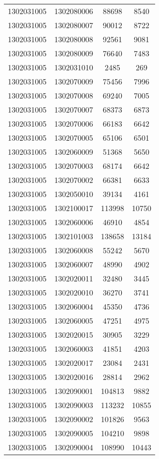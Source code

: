 \begin{longtable}{llcc}
1302031005 & 1302080006 & 88698 & 8540\\
1302031005 & 1302080007 & 90012 & 8722\\
1302031005 & 1302080008 & 92561 & 9081\\
1302031005 & 1302080009 & 76640 & 7483\\
1302031005 & 1302031010 & 2485 & 269\\
1302031005 & 1302070009 & 75456 & 7996\\
1302031005 & 1302070008 & 69240 & 7005\\
1302031005 & 1302070007 & 68373 & 6873\\
1302031005 & 1302070006 & 66183 & 6642\\
1302031005 & 1302070005 & 65106 & 6501\\
1302031005 & 1302060009 & 51368 & 5650\\
1302031005 & 1302070003 & 68174 & 6642\\
1302031005 & 1302070002 & 66381 & 6633\\
1302031005 & 1302050010 & 39134 & 4161\\
1302031005 & 1302100017 & 113998 & 10750\\
1302031005 & 1302060006 & 46910 & 4854\\
1302031005 & 1302101003 & 138658 & 13184\\
1302031005 & 1302060008 & 55242 & 5670\\
1302031005 & 1302060007 & 48990 & 4902\\
1302031005 & 1302020011 & 32480 & 3445\\
1302031005 & 1302020010 & 36270 & 3741\\
1302031005 & 1302060004 & 45350 & 4736\\
1302031005 & 1302060005 & 47251 & 4975\\
1302031005 & 1302020015 & 30905 & 3229\\
1302031005 & 1302060003 & 41851 & 4203\\
1302031005 & 1302020017 & 23084 & 2431\\
1302031005 & 1302020016 & 28814 & 2962\\
1302031005 & 1302090001 & 104813 & 9882\\
1302031005 & 1302090003 & 113232 & 10855\\
1302031005 & 1302090002 & 101826 & 9563\\
1302031005 & 1302090005 & 104210 & 9898\\
1302031005 & 1302090004 & 108990 & 10443\\

\end{longtable}
